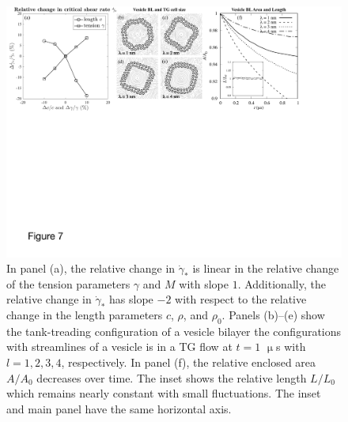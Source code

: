 \documentclass[prb,preprint,showpacs,preprintnumbers,amsmath,amssymb,longbibliography]{revtex4-2}
\begin{document}
\begin{figure}[t]
\begin{center}
  \includegraphics[width=\textwidth]{critical_shear_and_cell_size.pdf}
\end{center}
\caption{\label{fig:PramChange}
In panel (a), the relative change in $\dot \gamma_*$ is linear in the
  relative change of the tension parameters $\gamma$ and $M$ with slope
  $1$. Additionally, the relative change in $\dot \gamma_*$ has slope
  $-2$ with respect to the relative change in the length parameters $c$,
  $\rho$, and $\rho_0$. Panels (b)--(e) show the tank-treading
  configuration of a vesicle bilayer the configurations with streamlines
  of a vesicle is in a TG flow at $t=1$ $\upmu$s with $l= 1,2,3,4$,
  respectively. In panel (f), the relative enclosed area $A/A_0$
  decreases over time. The inset shows the relative length $L/L_0$ which
  remains nearly constant with small fluctuations. The inset and main
  panel have the same horizontal axis.} 
\end{figure}
\end{document}

